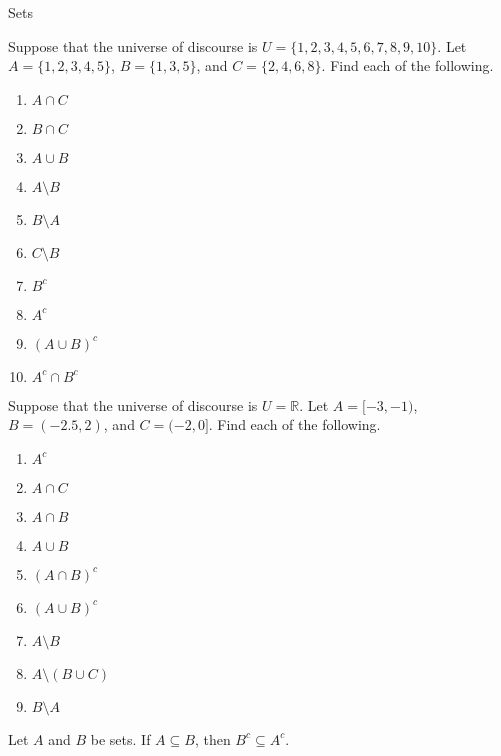 \begin{section}{Sets}
\begin{problem}
Suppose that the universe of discourse is $U=\{1,2,3,4,5,6,7,8,9,10\}$.  Let $A=\{1, 2, 3, 4, 5\}$, $B=\{1, 3, 5\}$, and $C=\{2, 4, 6, 8\}$.  Find each of the following.
\begin{multicols}{2}
\begin{enumerate}[label=\textrm{(\alph*)}]
\item $A \cap C$
\item $B \cap C$
\item $A \cup B$
\item $A\setminus B$
\item $B \setminus A$
\item $C \setminus B$
\item $B^c$
\item $A^c$
\item $(A\cup B)^c$
\item $A^c\cap B^c$
\end{enumerate}
\end{multicols}
\end{problem}

\begin{problem}
Suppose that the universe of discourse is $U=\mathbb{R}$.  Let $A=[-3,-1)$, $B=(-2.5,2)$, and $C=(-2,0]$.  Find each of the following.
\begin{multicols}{2}
\begin{enumerate}[label=\textrm{(\alph*)}]
\item $A^c$
\item $A \cap C$
\item $A \cap B$
\item $A \cup B$
\item $(A\cap B)^c$
\item $(A\cup B)^c$
\item $A \setminus B$
\item $A\setminus (B \cup C)$
\item $B \setminus A$
\end{enumerate}
\end{multicols}
\end{problem}

\begin{theorem}
Let $A$ and $B$ be sets.  If $A \subseteq B$, then $B^c \subseteq A^c$.
\end{theorem}


\end{section}

